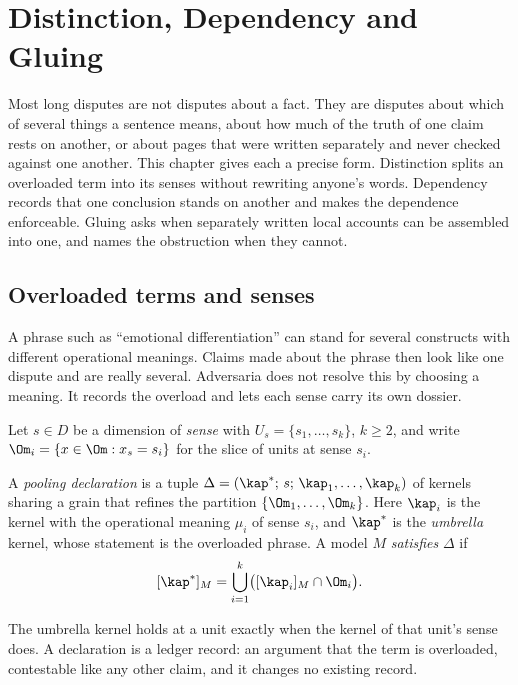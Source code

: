 \chapter{Distinction, Dependency and Gluing}\label{ch:distinction}

Most long disputes are not disputes about a fact. They are disputes about which of several things a sentence means, about how much of the truth of one claim rests on another, or about pages that were written separately and never checked against one another. This chapter gives each a precise form. Distinction splits an overloaded term into its senses without rewriting anyone's words. Dependency records that one conclusion stands on another and makes the dependence enforceable. Gluing asks when separately written local accounts can be assembled into one, and names the obstruction when they cannot.

\section{Overloaded terms and senses}

A phrase such as ``emotional differentiation'' can stand for several constructs with different operational meanings. Claims made about the phrase then look like one dispute and are really several. Adversaria does not resolve this by choosing a meaning. It records the overload and lets each sense carry its own dossier.

Let $s\in D$ be a dimension of \emph{sense} with $U_s=\{s_1,\dots,s_k\}$, $k\ge2$, and write $\Om_i=\{x\in\Om: x_s=s_i\}$ for the slice of units at sense $s_i$.

\begin{definition}\label{def:pooling}
A \emph{pooling declaration} is a tuple $\Delta=(\kap^*;\,s;\,\kap_1,\dots,\kap_k)$ of kernels sharing a grain that refines the partition $\{\Om_1,\dots,\Om_k\}$. Here $\kap_i$ is the kernel with the operational meaning $\mu_i$ of sense $s_i$, and $\kap^*$ is the \emph{umbrella} kernel, whose statement is the overloaded phrase. A model $M$ \emph{satisfies} $\Delta$ if
\[
[\kap^*]_M=\bigcup_{i=1}^k\bigl([\kap_i]_M\cap\Om_i\bigr).
\]
\end{definition}

The umbrella kernel holds at a unit exactly when the kernel of that unit's sense does. A declaration is a ledger record: an argument that the term is overloaded, contestable like any other claim, and it changes no existing record.

